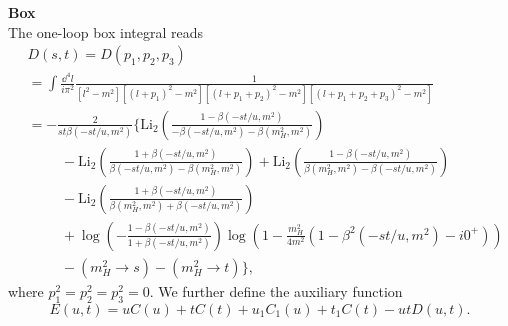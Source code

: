 \textbf{Box} \\
The one-loop box integral reads
\begin{equation}
\begin{split}
&D(s, t) = D(p_1, p_2, p_3) \\
& = \int \frac{\dd^4 l}{i \pi^2} \frac{1}{[l^2 - m^2] [(l + p_1)^2 - m^2] [(l + p_1 + p_2)^2 - m^2][(l + p_1 + p_2 + p_3)^2 - m^2]} \\
& = -\frac{2}{st \beta(-st/u, m^2)} \bigg \lbrace \mathrm{Li}_2\!\left( \frac{1 - \beta (-st/u, m^2)}{- \beta(-st/u, m^2) - \beta(m_H^2, m^2)} \right)  \\
& \hspace{1cm} - \mathrm{Li}_2\!\left( \frac{1 + \beta (-st/u, m^2)}{\beta(-st/u, m^2) - \beta(m_H^2, m^2)} \right) + \mathrm{Li}_2\!\left( \frac{1 - \beta (-st/u, m^2)}{\beta(m_H^2, m^2) - \beta(-st/u, m^2)} \right) \\
& \hspace{1cm}  - \mathrm{Li}_2\!\left( \frac{1 + \beta (-st/u, m^2)}{\beta(m_H^2, m^2) + \beta(-st/u, m^2)} \right) \\
&\hspace{1cm} + \log\!\left(- \frac{1 - \beta(-st/u, m^2)}{1 + \beta(-st/u, m^2)} \right) \log\left(1 - \frac{m_H^2}{4 m^2} (1 - \beta^2(-st/u, m^2) - i0^+) \right) \\
& \hspace{1cm} - (m_H^2 \rightarrow s) - (m_H^2 \rightarrow t)\bigg \rbrace,
\end{split}
\end{equation}
where $p_1^2 = p_2^2 = p_3^2 = 0$. We further define the auxiliary function
\begin{equation}
E(u, t) = u C(u) + t C(t) + u_1 C_1(u) + t_1 C(t) - u t D(u, t).
\end{equation}
